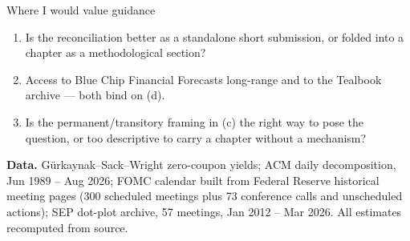 \documentclass[11pt,aspectratio=169]{beamer}
\newcommand{\tk}[1]{{\color{ink2}\footnotesize #1}}
\begin{document}
\begin{frame}{Where I would value guidance}
\begin{enumerate}\setlength\itemsep{0.5em}
  \item Is the reconciliation better as a standalone short submission, or folded into a chapter as a methodological section?
  \item Access to Blue Chip Financial Forecasts long-range and to the Tealbook archive --- both bind on (d).
  \item Is the permanent/transitory framing in (c) the right way to pose the question, or too descriptive to carry a chapter without a mechanism?
\end{enumerate}
\vspace{0.8em}
\tk{\textbf{Data.} G\"urkaynak--Sack--Wright zero-coupon yields; ACM daily decomposition, Jun 1989 -- Aug 2026; FOMC calendar built from Federal Reserve historical meeting pages (300 scheduled meetings plus 73 conference calls and unscheduled actions); SEP dot-plot archive, 57 meetings, Jan 2012 -- Mar 2026. All estimates recomputed from source.}
\end{frame}
\end{document}
